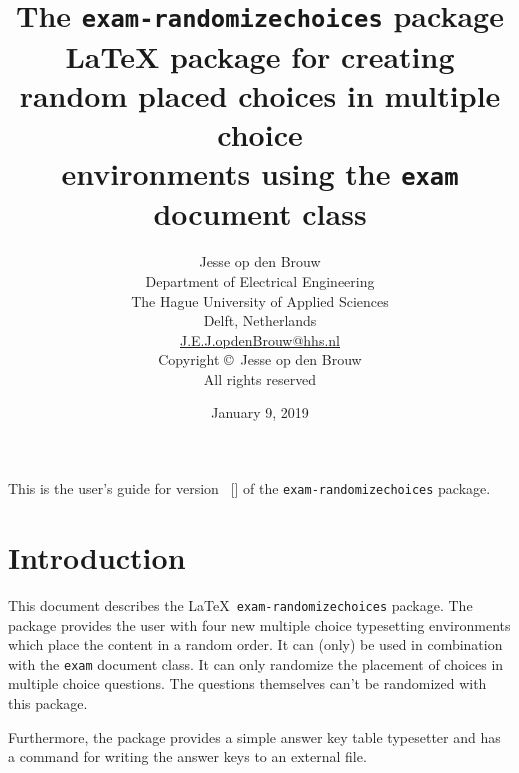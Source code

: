\documentclass[12pt,a4paper]{exam}
\newcommand{\styversion}{\fileversion}
\newcommand{\stydate}{\filedate}
\newcommand{\docdate}{January 9, 2019}
\begin{document}
\raggedbottom


\title{The \texttt{exam-randomizechoices} package\\[2ex]\normalsize LaTeX package for creating random placed choices in multiple choice \\environments using the \texttt{exam} document class}

\author{Jesse op den Brouw\\
  Department of Electrical Engineering\\
  The Hague University of Applied Sciences\\
  Delft, Netherlands\\
  \href{mailto:J.E.J.opdenBrouw@hhs.nl}{J.E.J.opdenBrouw@hhs.nl}\\[\bigskipamount]
  Copyright \copyright \the\year\ Jesse op den Brouw\\
  All rights reserved}

\date{\docdate}

\maketitle

\thispagestyle{empty}

\vspace*{2cm}

\begin{center}
  \small
  This is the user's guide for version~\styversion{} [\stydate] of the
  \verb|exam-randomizechoices| package. 
\end{center}

\clearpage
\tableofcontents

\clearpage


\section{Introduction}
This document describes the \LaTeX\ \texttt{exam-randomizechoices} package.
The package provides the user with four new multiple choice typesetting
environments which place the content in a random order. It can (only) be used
in combination with the \texttt{exam} document class. It can only
randomize the placement of choices in multiple choice questions. The questions
themselves can't be randomized with this package.

Furthermore, the package provides a simple answer key table typesetter and has
a command for writing the answer keys to an external file.
\end{document}
